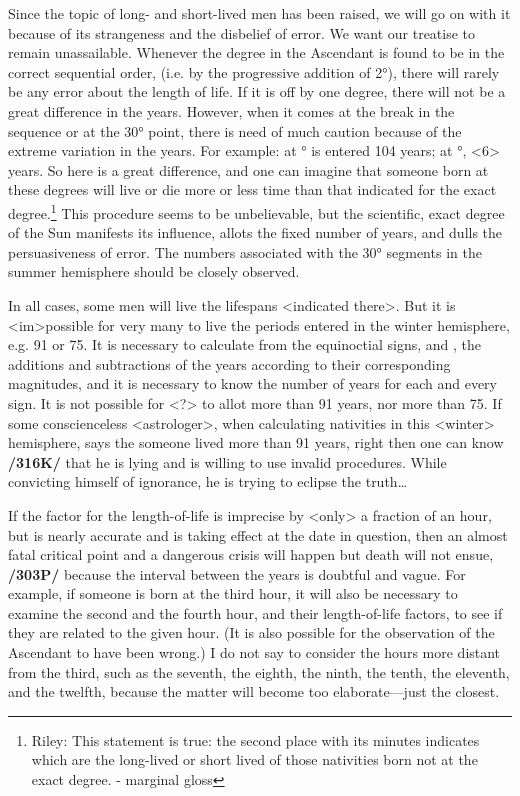 Since the topic of long- and short-lived men has been raised, we will go on with it because of its strangeness and the disbelief of error. We want our treatise to remain unassailable. Whenever the degree in
the Ascendant is found to be in the correct sequential order, (i.e. by the progressive addition of 2°), there will rarely be any error about the length of life. If it is off by one degree, there will not be a great difference in the years. However, when it comes at the break in the sequence or at the 30° point, there is need of much caution because of the extreme variation in the years. For example: at \Cancer\xspace 27° is entered 104 years; at \Cancer\xspace 28°, <6> years. So here is a great difference, and one can imagine that someone born at
these degrees will live or die more or less time than that indicated for the exact degree.\footnote{Riley: This statement is true: the second place with its minutes indicates which are the long-lived or short lived
of those nativities born not at the exact degree. - marginal gloss} This procedure seems to be unbelievable, but the scientific, exact degree of the Sun manifests its influence, allots the fixed number of years, and dulls the persuasiveness of error. The numbers associated with the 30° segments in the summer hemisphere should be closely observed.

In all cases, some men will live the lifespans <indicated there>. But it is <im>possible for very many to live the periods entered in the winter hemisphere, e.g. 91 or 75. It is necessary to calculate from the equinoctial signs, \Aries\xspace and \Libra, the additions and subtractions of the years according to their corresponding magnitudes, and it is necessary to know the number of years for each and every sign. It is not possible for \Libra\xspace <?> to allot more than 91 years, nor \Capricorn\xspace more than 75. If some conscienceless <astrologer>, when calculating nativities in this <winter> hemisphere, says the someone lived more than
91 years, right then one can know \textbf{/316K/} that he is lying and is willing to use invalid procedures. While convicting himself of ignorance, he is trying to eclipse the truth…

If the factor for the length-of-life is imprecise by <only> a fraction of an hour, but is nearly accurate and is taking effect at the date in question, then an almost fatal critical point and a dangerous crisis will happen but death will not ensue, \textbf{/303P/} because the interval between the years is doubtful and vague. For example, if someone is born at the third hour, it will also be necessary to examine the second and the fourth hour, and their length-of-life factors, to see if they are related to the given hour. (It is also possible
for the observation of the Ascendant to have been wrong.) I do not say to consider the hours more distant from the third, such as the seventh, the eighth, the ninth, the tenth, the eleventh, and the twelfth, because the matter will become too elaborate—just the closest. 

